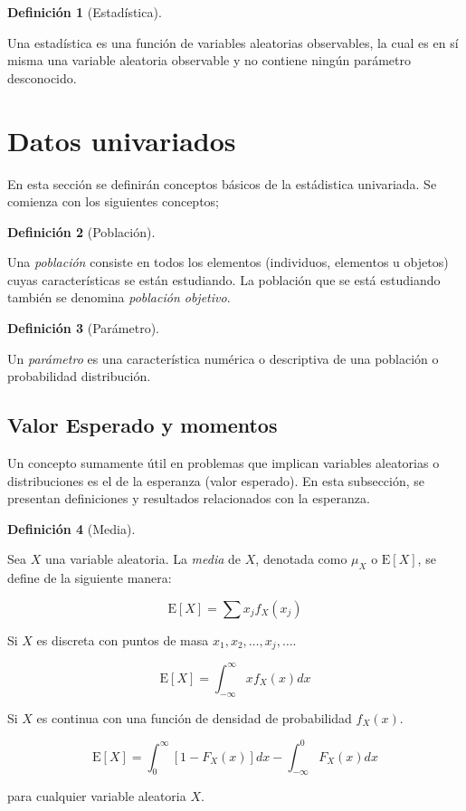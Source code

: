 \documentclass[
  letterpaper,
  DIV=11,
  numbers=noendperiod]{scrreport}
\theoremstyle{plain}
\theoremstyle{definition}
\newtheorem{definition}{Definición}[chapter]
\theoremstyle{definition}
\theoremstyle{plain}
\theoremstyle{remark}
\begin{document}
\begin{definition}[Estadística]\protect\hypertarget{def-estad}{}\label{def-estad}

Una estadística es una función de variables aleatorias observables, la
cual es en sí misma una variable aleatoria observable y no contiene
ningún parámetro desconocido.

\end{definition}

\section{Datos univariados}\label{datos-univariados}

En esta sección se definirán conceptos básicos de la estádistica
univariada. Se comienza con los siguientes conceptos;

\begin{definition}[Población]\protect\hypertarget{def-pobla}{}\label{def-pobla}

Una \emph{población} consiste en todos los elementos (individuos,
elementos u objetos) cuyas características se están estudiando. La
población que se está estudiando también se denomina \emph{población
objetivo}.

\end{definition}

\begin{definition}[Parámetro]\protect\hypertarget{def-param}{}\label{def-param}

Un \emph{parámetro} es una característica numérica o descriptiva de una
población o probabilidad distribución.

\end{definition}

\subsection{Valor Esperado y momentos}\label{valor-esperado-y-momentos}

Un concepto sumamente útil en problemas que implican variables
aleatorias o distribuciones es el de la esperanza (valor esperado). En
esta subsección, se presentan definiciones y resultados relacionados con
la esperanza.

\begin{definition}[Media]\protect\hypertarget{def-mean}{}\label{def-mean}

Sea \(X\) una variable aleatoria. La \emph{media} de \(X\), denotada
como \(\mu_X\) o \(\mathrm E[X]\), se define de la siguiente manera:

\[ \mathrm E[X]= \sum x_jf_X(x_j) \]

Si \(X\) es discreta con puntos de masa
\(x_1, x_2, \ldots, x_j, \ldots\).

\[ \mathrm E[X]=\int_{-\infty}^\infty x f_X(x)dx \]

Si \(X\) es continua con una función de densidad de probabilidad
\(f_X(x)\).

\[ \mathrm E[X]=\int_0^\infty [1-F_X(x)]dx-\int_{-\infty}^0 F_X(x) dx \]

para cualquier variable aleatoria \(X\).

\end{definition}
\end{document}
